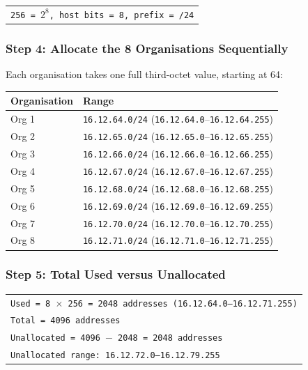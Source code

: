 \documentclass[11pt,a4paper]{article}
\begin{document}
\begin{tabularx}{\textwidth}{@{}X@{}}
\texttt{256 = $2^{8}$, host bits = 8, prefix = /24} \\
\end{tabularx}

\subsubsection*{Step 4: Allocate the 8 Organisations Sequentially}

Each organisation takes one full third-octet value, starting at 64:

\begin{tabularx}{\textwidth}{@{}lX@{}}
\toprule
\rowcolor{tablehead}\textbf{Organisation} & \textbf{Range} \\
\midrule
Org 1 & \texttt{16.12.64.0/24} (\texttt{16.12.64.0}--\texttt{16.12.64.255}) \\
Org 2 & \texttt{16.12.65.0/24} (\texttt{16.12.65.0}--\texttt{16.12.65.255}) \\
Org 3 & \texttt{16.12.66.0/24} (\texttt{16.12.66.0}--\texttt{16.12.66.255}) \\
Org 4 & \texttt{16.12.67.0/24} (\texttt{16.12.67.0}--\texttt{16.12.67.255}) \\
Org 5 & \texttt{16.12.68.0/24} (\texttt{16.12.68.0}--\texttt{16.12.68.255}) \\
Org 6 & \texttt{16.12.69.0/24} (\texttt{16.12.69.0}--\texttt{16.12.69.255}) \\
Org 7 & \texttt{16.12.70.0/24} (\texttt{16.12.70.0}--\texttt{16.12.70.255}) \\
Org 8 & \texttt{16.12.71.0/24} (\texttt{16.12.71.0}--\texttt{16.12.71.255}) \\
\bottomrule
\end{tabularx}

\subsubsection*{Step 5: Total Used versus Unallocated}

\begin{tabularx}{\textwidth}{@{}X@{}}
\texttt{Used = 8 $\times$ 256 = 2048 addresses (16.12.64.0--16.12.71.255)} \\
\texttt{Total = 4096 addresses} \\
\texttt{Unallocated = 4096 $-$ 2048 = 2048 addresses} \\
\texttt{Unallocated range: 16.12.72.0--16.12.79.255} \\
\end{tabularx}
\end{document}
